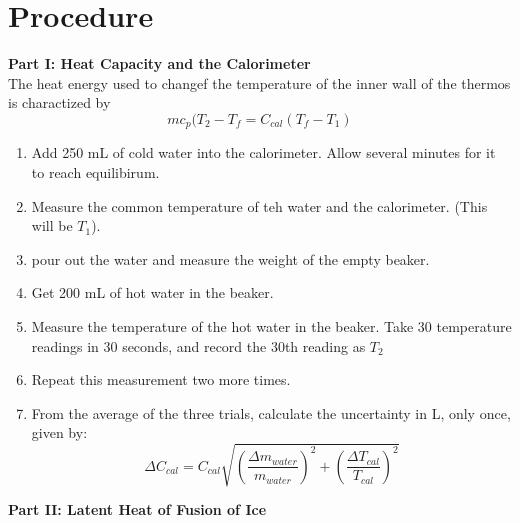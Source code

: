 \documentclass[12pt]{report}
\begin{document}
\section{Procedure}

\textbf{Part I: Heat Capacity and the Calorimeter}\\
The heat energy used to changef the temperature of the inner wall of the thermos is charactized by
	\[mc_p(T_2 - T_f = C_{cal}(T_f - T_1)\]

\begin{enumerate}
	\item Add 250 mL of cold water into the calorimeter. Allow several minutes for it to reach equilibirum.
	\item Measure the common temperature of teh water and the calorimeter. (This will be $T_1$).
	\item pour out the water and measure the weight of the empty beaker.
	\item Get 200 mL of hot water in the beaker.
	\item Measure the temperature of the hot water in the beaker. Take 30 temperature readings in 30 seconds, and record the 30th reading as $T_2$
	\item Repeat this measurement two more times.
	\item From the average of the three trials, calculate the uncertainty in L, only once, given by:
		\[ \Delta C_{cal} = C_{cal}\sqrt{ (\frac{\Delta m_{water}}{m_{water}})^2 + ( \frac{\Delta T_{cal}}{T_{cal}})^2} \]
\end{enumerate}
\textbf{Part II: Latent Heat of Fusion of Ice}
\end{document}

